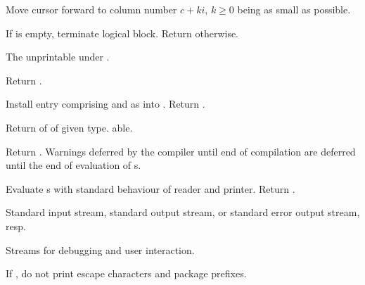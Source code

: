 \begin{LIST}{1cm}
\begin{LIST}{.5cm}
    Move cursor forward to column number $c + ki$, $k \geq 0$ being as small
    as possible.

    If  is empty, terminate logical block. Return
    \retval{\NIL} otherwise.

  \end{LIST}


  The  unprintable under .

  Return .

  Install entry comprising  and  as
   into . Return \retval{\NIL}.

  Return  of  of given type. able.


  Return . Warnings deferred by the compiler until end
  of compilation are deferred until the end of evaluation of s.
  

  Evaluate s with standard behaviour of reader and
  printer. Return .

  Standard input stream, standard output stream, 
  or standard error output stream, resp.


  Streams for debugging and user interaction.

  If \NIL, do not print escape characters and package prefixes.


\end{LIST}
